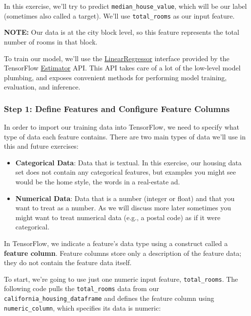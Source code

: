 \documentclass[11pt]{article}
\begin{document}
In this exercise, we'll try to predict \texttt{median\_house\_value},
which will be our label (sometimes also called a target). We'll use
\texttt{total\_rooms} as our input feature.

\textbf{NOTE:} Our data is at the city block level, so this feature
represents the total number of rooms in that block.

To train our model, we'll use the
\href{https://www.tensorflow.org/api_docs/python/tf/estimator/LinearRegressor}{LinearRegressor}
interface provided by the TensorFlow
\href{https://www.tensorflow.org/get_started/estimator}{Estimator} API.
This API takes care of a lot of the low-level model plumbing, and
exposes convenient methods for performing model training, evaluation,
and inference.

    \hypertarget{step-1-define-features-and-configure-feature-columns}{%
\subsubsection{Step 1: Define Features and Configure Feature
Columns}\label{step-1-define-features-and-configure-feature-columns}}

    In order to import our training data into TensorFlow, we need to specify
what type of data each feature contains. There are two main types of
data we'll use in this and future exercises:

\begin{itemize}
\item
  \textbf{Categorical Data}: Data that is textual. In this exercise, our
  housing data set does not contain any categorical features, but
  examples you might see would be the home style, the words in a
  real-estate ad.
\item
  \textbf{Numerical Data}: Data that is a number (integer or float) and
  that you want to treat as a number. As we will discuss more later
  sometimes you might want to treat numerical data (e.g., a postal code)
  as if it were categorical.
\end{itemize}

In TensorFlow, we indicate a feature's data type using a construct
called a \textbf{feature column}. Feature columns store only a
description of the feature data; they do not contain the feature data
itself.

To start, we're going to use just one numeric input feature,
\texttt{total\_rooms}. The following code pulls the
\texttt{total\_rooms} data from our
\texttt{california\_housing\_dataframe} and defines the feature column
using \texttt{numeric\_column}, which specifies its data is numeric:
\end{document}
